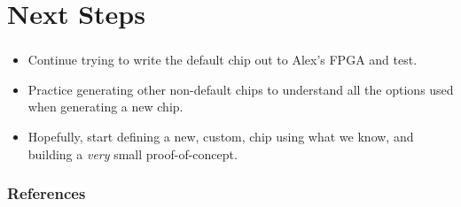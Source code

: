\documentclass{../weeklyslides}
\begin{document}
\section{Next Steps}\label{sec:Next_Steps}
\begin{frame}
  \frametitle{}
  \begin{itemize}
  \item Continue trying to write the default chip out to Alex's FPGA and test.
  \item Practice generating other non-default chips to understand all the options used when generating a new chip.
  \item Hopefully, start defining a new, custom, chip using what we know, and building a \emph{very} small proof-of-concept.
  \end{itemize}
\end{frame}

\begin{frame}
  \frametitle{References}
  \printbibliography[heading=bibintoc]{}
\end{frame}
\end{document}
